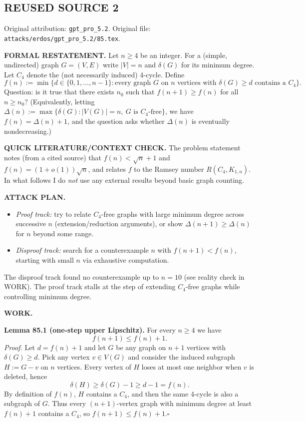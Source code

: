 
\subsection*{REUSED SOURCE 2}
Original attribution: \texttt{gpt\_pro\_5.2}.
Original file: \texttt{attacks/erdos/gpt\_pro\_5.2/85.tex}.



\noindent\textbf{FORMAL RESTATEMENT.}
Let $n\ge 4$ be an integer. For a (simple, undirected) graph $G=(V,E)$ write $|V|=n$ and $\delta(G)$ for its minimum degree. Let $C_4$ denote the (not necessarily induced) 4-cycle.
Define
\[
 f(n) := \min\big\{ d\in\{0,1,\dots,n-1\} : \text{every graph }G\text{ on }n\text{ vertices with }\delta(G)\ge d\text{ contains a }C_4\big\}.
\]
Question: is it true that there exists $n_0$ such that $f(n+1)\ge f(n)$ for all $n\ge n_0$?
(Equivalently, letting $\Delta(n):=\max\{\delta(G): |V(G)|=n,\ G\text{ is }C_4\text{-free}\}$, we have $f(n)=\Delta(n)+1$, and the question asks whether $\Delta(n)$ is eventually nondecreasing.)

\medskip
\noindent\textbf{QUICK LITERATURE/CONTEXT CHECK.}
The problem statement notes (from a cited source) that $f(n)<\sqrt n+1$ and $f(n)=(1+o(1))\sqrt n$, and relates $f$ to the Ramsey number $R(C_4,K_{1,n})$. In what follows I do \emph{not} use any external results beyond basic graph counting.

\medskip
\noindent\textbf{ATTACK PLAN.}
\begin{itemize}
\item \emph{Proof track:} try to relate $C_4$-free graphs with large minimum degree across successive $n$ (extension/reduction arguments), or show $\Delta(n+1)\ge \Delta(n)$ for $n$ beyond some range.
\item \emph{Disproof track:} search for a counterexample $n$ with $f(n+1)<f(n)$, starting with small $n$ via exhaustive computation.
\end{itemize}
The disproof track found no counterexample up to $n=10$ (see reality check in WORK). The proof track stalls at the step of extending $C_4$-free graphs while controlling minimum degree.

\medskip
\noindent\textbf{WORK.}

\smallskip
\noindent\textbf{Lemma 85.1 (one-step upper Lipschitz).}
For every $n\ge 4$ we have
\[
 f(n+1)\le f(n)+1.
\]
\textit{Proof.}
Let $d=f(n)+1$ and let $G$ be any graph on $n+1$ vertices with $\delta(G)\ge d$.
Pick any vertex $v\in V(G)$ and consider the induced subgraph $H:=G-v$ on $n$ vertices. Every vertex of $H$ loses at most one neighbor when $v$ is deleted, hence
\[
\delta(H)\ge \delta(G)-1\ge d-1 = f(n).
\]
By definition of $f(n)$, $H$ contains a $C_4$, and then the same 4-cycle is also a subgraph of $G$. Thus every $(n+1)$-vertex graph with minimum degree at least $f(n)+1$ contains a $C_4$, so $f(n+1)\le f(n)+1$.\hfill $\square$

